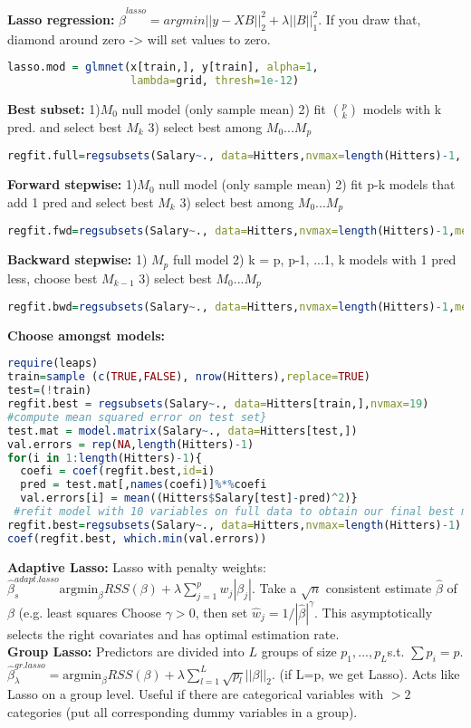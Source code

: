 \textbf{Lasso regression: }
$\hat\beta^{lasso} = argmin ||y-XB||_2^2+ \lambda||B||_1^2$. If you draw that, diamond around zero -> will set values to zero. 
\begin{lstlisting}[language=R]
lasso.mod = glmnet(x[train,], y[train], alpha=1, 
                   lambda=grid, thresh=1e-12)
\end{lstlisting}
\textbf{Best subset: }
1)$M_0$ null model (only sample mean)
2) fit $p \choose k$ models with k pred. and select best $M_k$
3) select best among $M_0 ... M_p$
\begin{lstlisting}[language=R]
regfit.full=regsubsets(Salary~., data=Hitters,nvmax=length(Hitters)-1, method = "exhaustive")
\end{lstlisting}

\textbf{Forward stepwise: }
1)$M_0$ null model (only sample mean)
2) fit p-k models that add 1 pred and select best $M_k$
3) select best among $M_0 ... M_p$
\begin{lstlisting}[language=R]
regfit.fwd=regsubsets(Salary~., data=Hitters,nvmax=length(Hitters)-1,method="forward")
\end{lstlisting}
\textbf{Backward stepwise: }
1) $M_p$ full model
2) k = p, p-1, ...1,
k models with 1 pred less, choose best $M_{k-1}$
3) select best $M_0 ... M_p$
\begin{lstlisting}[language=R]
regfit.bwd=regsubsets(Salary~., data=Hitters,nvmax=length(Hitters)-1,method="backward")
\end{lstlisting}
\textbf{Choose amongst models: }
\begin{lstlisting}[language=R]
require(leaps)
train=sample (c(TRUE,FALSE), nrow(Hitters),replace=TRUE)
test=(!train)
regfit.best = regsubsets(Salary~., data=Hitters[train,],nvmax=19)
#compute mean squared error on test set}
test.mat = model.matrix(Salary~., data=Hitters[test,])
val.errors = rep(NA,length(Hitters)-1)
for(i in 1:length(Hitters)-1){
  coefi = coef(regfit.best,id=i)
  pred = test.mat[,names(coefi)]%*%coefi
  val.errors[i] = mean((Hitters$Salary[test]-pred)^2)}
 #refit model with 10 variables on full data to obtain our final best model
regfit.best=regsubsets(Salary~., data=Hitters,nvmax=length(Hitters)-1)
coef(regfit.best, which.min(val.errors))
\end{lstlisting}

\textbf{Adaptive Lasso:} Lasso with penalty weights: $\hat\beta_s^{adapt.lasso}\text{argmin}_\beta RSS(\beta) + \lambda \sum_{j=1}^p w_j |\beta_j|$. Take a $\sqrt{n}$ consistent estimate $\hat\beta$ of $\beta$ (e.g. least squares Choose $\gamma>0$, then set $\hat w_j = {1}/{|\hat\beta|^\gamma}$. This asymptotically selects the right covariates and has optimal estimation rate.\\
\textbf{Group Lasso:} Predictors are divided into $L$ groups of size $p_1, ..., p_L$s.t. $\sum p_i = p$. $\hat\beta_\lambda^{gr.lasso}=\text{argmin}_\beta RSS(\beta)+\lambda \sum_{l=1}^L \sqrt{p_l} ||\beta||_2$. (if L=p, we get Lasso). Acts like Lasso on a group level. Useful if there are categorical variables with $>2$ categories (put all corresponding dummy variables in a group).